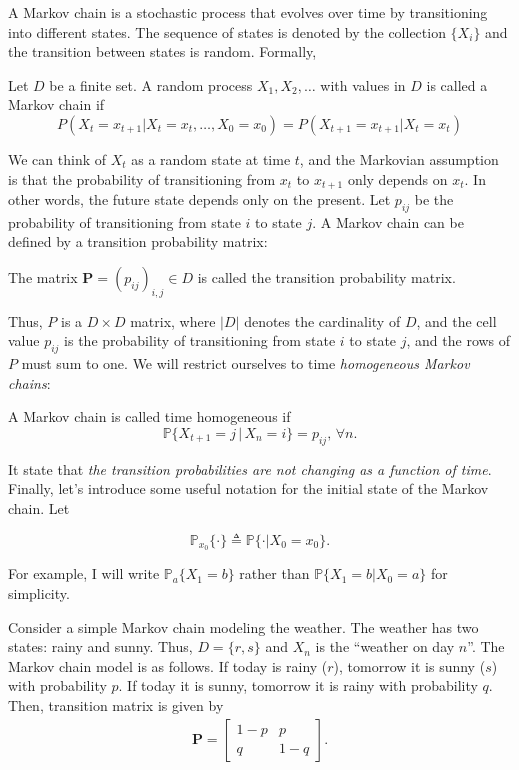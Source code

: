 A Markov chain is a stochastic process that evolves over time by transitioning into different states. The sequence of states is denoted by the collection $\{X_i\}$ and the transition between states is random. Formally,
\begin{definition}
Let $D$ be a finite set. A random process $X_1, X_2,\dots$ with values in $D$ is called a Markov chain if
$$P(X_t=x_{t+1}|X_{t}=x_t,\dots,X_0=x_0)=P(X_{t+1}=x_{t+1}|X_{t}=x_t)$$
\end{definition}
We can think of $X_t$ as a random state at time $t$, and the Markovian assumption is that the probability of transitioning from $x_t$ to $x_{t+1}$ only depends on $x_t$. In other words, the future state depends only on the present. Let $p_{ij}$ be the probability of transitioning from state $i$ to state $j$. A Markov chain can be defined by a transition probability matrix:
\begin{definition}
	The matrix $\mathbf{P}=(p_{ij})_{i,j}\in D$ is called the transition probability matrix.
\end{definition}
Thus, $P$ is a $D \times D$ matrix, where $|D|$ denotes the cardinality of $D$, and the cell value $p_{ij}$ is the probability of transitioning from state $i$ to state $j$, and the rows of $P$ must sum to one. We will restrict ourselves to time \textit{homogeneous Markov chains}:

\begin{definition}
A Markov chain is called time homogeneous if 
$$\mathbb{P}\{X_{t+1}=j\, |\, X_n=i\}=p_{ij},\, \forall n.$$
\end{definition}
It state that \textit{the transition probabilities are not changing as a function of time}. Finally, let's introduce some useful notation for the initial state of the Markov chain. Let

$$\mathbb{P}_{x_0}\{\cdot\}\triangleq \mathbb{P}\{\cdot | X_0=x_0\}.$$

For example, I will write $\mathbb{P}_a\{X_1=b\}$ rather than $\mathbb{P}\{X_1=b|X_0=a\}$ for simplicity. 

Consider a simple Markov chain modeling the weather. The weather has two states: rainy and sunny. Thus, $D = \{r, s\}$ and $X_n$ is the ``weather on day $n$''. The Markov chain model is as follows. If today is rainy ($r$), tomorrow it is sunny ($s$) with probability $p$. If today it is sunny, tomorrow it is rainy with probability $q$. Then, transition matrix is given by 
\begin{align*}
	\mathbf{P} = 
	\begin{bmatrix}
		1-p & p\\
		q & 1-q
	\end{bmatrix}.
\end{align*}

